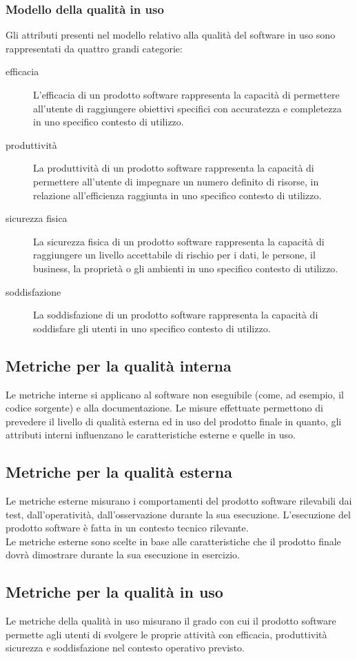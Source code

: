 		\subsubsection{Modello della qualità in uso}
			Gli attributi presenti nel modello relativo alla qualità del software in uso sono rappresentati da quattro grandi categorie:
			\begin{description}
				\item[efficacia] L'efficacia di un prodotto software rappresenta la capacità di permettere all'utente di raggiungere obiettivi specifici con accuratezza e completezza in uno specifico contesto di utilizzo.
				\item[produttività] La produttività di un prodotto software rappresenta la capacità di permettere all'utente di impegnare un numero definito di risorse, in relazione all'efficienza raggiunta in uno specifico contesto di utilizzo.
				\item[sicurezza fisica] La sicurezza fisica di un prodotto software rappresenta la capacità di raggiungere un livello accettabile di rischio per i dati, le persone, il business, la proprietà o gli ambienti in uno specifico contesto di utilizzo.
				\item[soddisfazione] La soddisfazione di un prodotto software rappresenta la capacità di soddisfare gli utenti in uno specifico contesto di utilizzo.
			\end{description}
	\subsection{Metriche per la qualità interna}
		Le metriche interne si applicano al software non eseguibile (come, ad esempio, il codice sorgente) e alla documentazione. Le misure effettuate permettono di prevedere il livello di qualità esterna ed in uso del prodotto finale in quanto, gli attributi interni influenzano le caratteristiche esterne e quelle in uso.
	\subsection{Metriche per la qualità esterna}
		Le metriche esterne misurano i comportamenti del prodotto software rilevabili dai test, dall'operatività, dall'osservazione durante la sua esecuzione. L'esecuzione del prodotto software è fatta in un contesto tecnico rilevante.\\
		Le metriche esterne sono scelte in base alle caratteristiche che il prodotto finale dovrà dimostrare durante la sua esecuzione in esercizio.
	\subsection{Metriche per la qualità in uso}
		Le metriche della qualità in uso misurano il grado con cui il prodotto software permette agli utenti di svolgere le proprie attività con efficacia, produttività sicurezza e soddisfazione nel contesto operativo previsto.